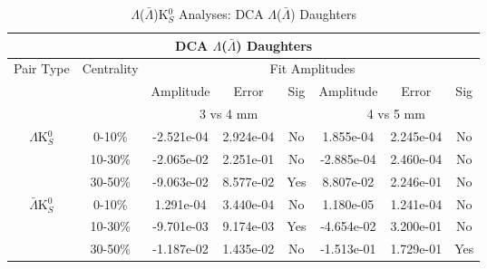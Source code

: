 \documentclass[../AnalysisNoteJBuxton.tex]{subfiles}
\begin{document}
\begin{table}
 \centering
 \begin{tabular}{|c|c|c|c|c||c|c|c|}
  \multicolumn{8}{c}{DCA $\Lambda$($\bar{\Lambda}$) Daughters} \\
  \hline
  \multirow{3}{*}{Pair Type} & \multirow{3}{*}{Centrality} & \multicolumn{6}{c|}{Fit Amplitudes} \\
  \cline{3-8}
   & & Amplitude & Error & Sig & Amplitude & Error & Sig \\  
  \cline{3-8}
   & & \multicolumn{3}{c||}{3 vs 4 mm} & \multicolumn{3}{c|}{4 vs 5 mm} \\  
  \hline  
  \multirow{3}{*}{$\Lambda$K$^{0}_{S}$}  
   &  0-10\% & -2.521e-04 & 2.924e-04 & No & 1.855e-04 & 2.245e-04 & No \\
   & 10-30\% & -2.065e-02 & 2.251e-01 & No & -2.885e-04 & 2.460e-04 & No \\
   & 30-50\% & -9.063e-02 & 8.577e-02 & Yes & 8.807e-02 & 2.246e-01 & No \\
  \hline  
  \multirow{3}{*}{$\bar{\Lambda}$K$^{0}_{S}$}  
   &  0-10\% & 1.291e-04 & 3.440e-04 & No & 1.180e-05 & 1.241e-04 & No \\
   & 10-30\% & -9.701e-03 & 9.174e-03 & Yes & -4.654e-02 & 3.200e-01 & No \\
   & 30-50\% & -1.187e-02 & 1.435e-02 & No & -1.513e-01 & 1.729e-01 & Yes \\
  \hline
 \end{tabular}
 \caption{$\Lambda$($\bar{\Lambda}$)K$^{0}_{S}$ Analyses: DCA $\Lambda$($\bar{\Lambda}$) Daughters}
 \label{tab:LamDaughtersDcaLamK0}
\end{table}
\end{document}

